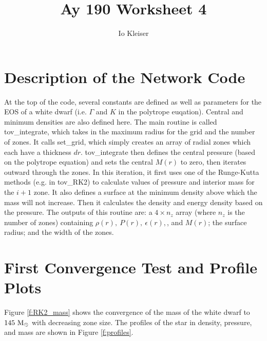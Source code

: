 \documentclass[12pt,preprint]{aastex}
\begin{document}

\title {Ay 190 Worksheet 4} 

\author{Io Kleiser}  

\section{Description of the Network Code}

At the top of the code, several constants are defined as well as parameters for the EOS of a white dwarf (i.e. $\Gamma$ and $K$ in the polytrope euqation). Central and minimum densities are also defined here. The main routine is called tov\_integrate, which takes in the maximum radius for the grid and the number of zones. It calls set\_grid, which simply creates an array of radial zones which each have a thickness $dr$. tov\_integrate then defines the central pressure (based on the polytrope equation) and sets the central $M(r)$ to zero, then iterates outward through the zones. In this iteration, it first uses one of the Runge-Kutta methods (e.g. in tov\_RK2) to calculate values of pressure and interior mass for the $i+1$ zone. It also defines a surface at the minimum density above which the mass will not increase. Then it calculates the density and energy density based on the pressure. The outputs of this routine are: a $4\times n_z$ array (where $n_z$ is the number of zones) containing $\rho(r),~P(r),~\epsilon(r),$, and $M(r)$; the surface radius; and the width of the zones.

\section{First Convergence Test and Profile Plots}

Figure \ref{f:RK2_mass} shows the convergence of the mass of the white dwarf to $145~{\rm M}_\odot$ with decreasing zone size. The profiles of the star in density, pressure, and mass are shown in Figure \ref{f:profiles}.
\end{document}
